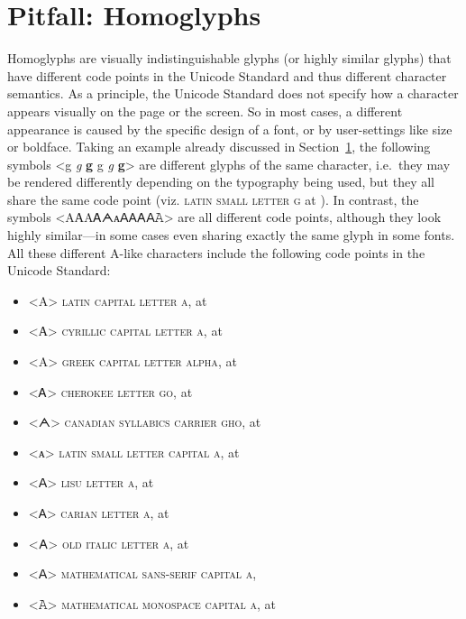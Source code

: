 \section{Pitfall: Homoglyphs}
\label{pitfall-homoglyphs}

Homoglyphs are visually indistinguishable glyphs (or highly similar glyphs) that
have different code points in the Unicode Standard and thus different character
semantics. As a principle, the Unicode Standard does not specify how a character
appears visually on the page or the screen. So in most cases, a different
appearance is caused by the specific design of a font, or by user-settings like
size or boldface. Taking an example already discussed in
Section~\ref{pitfall-homoglyphs}, the following symbols <g {\large \textit{g}}
\textbf{g} { {\small g} \textit{g} \textbf{g}}> are different
glyphs of the same character, i.e.~they may be rendered differently depending on
the typography being used, but they all share the same code point (viz.
\textsc{latin small letter g} at ). In contrast, the symbols
<{AАΑᎪᗅᴀꓮ𐊠𐌀𝖠𝙰}> are all different code points,
although they look highly similar---in some cases even sharing exactly the same
glyph in some fonts. All these different A-like characters include the following
code points in the Unicode Standard:

\begin{itemize}
	\item <{A}> \textsc{latin capital letter a}, at  
	\item <{А}> \textsc{cyrillic capital letter a}, at  
	\item <{Α}> \textsc{greek capital letter alpha}, at  
	\item <{Ꭺ}> \textsc{cherokee letter go}, at  
	\item <{ᗅ}> \textsc{canadian syllabics carrier gho}, at  
	\item <{ᴀ}> \textsc{latin small letter capital a}, at  
	\item <{ꓮ}> \textsc{lisu letter a}, at  
	\item <{𐊠}> \textsc{carian letter a}, at  
	\item <{𐌀}> \textsc{old italic letter a}, at  
	\item <{𝖠}> \textsc{mathematical sans-serif capital a},  
	\item <{𝙰}> \textsc{mathematical monospace capital a}, at  
\end{itemize}

